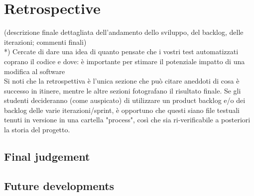 \documentclass[a4paper,12pt]{report}
\begin{document}

\chapter{Retrospective}

(descrizione finale dettagliata dell'andamento dello sviluppo, del backlog, delle iterazioni; commenti finali)\\

*) Cercate di dare una idea di quanto pensate che i vostri test automatizzati coprano il codice e dove: è importante per stimare il potenziale impatto di una modifica al software\\


Si noti che la retrospettiva è l'unica sezione che può citare aneddoti di cosa è successo in itinere, mentre le altre sezioni fotografano il risultato finale. Se gli studenti decideranno (come auspicato) di utilizzare un product backlog e/o dei backlog delle varie iterazioni/sprint, è opportuno che questi siano file testuali tenuti in versione in una cartella "process", così che sia ri-verificabile a posteriori la storia del progetto.

\section{Final judgement}
\section{Future developments}
\end{document}

